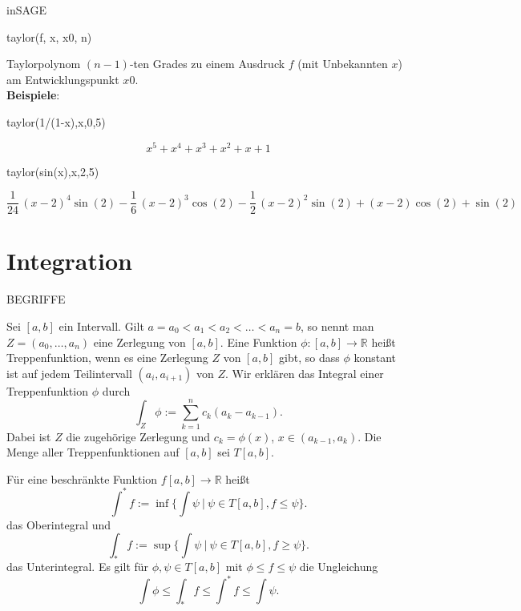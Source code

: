 \documentclass[fontsize=12pt,paper=a4,twoside,bibtotoc,idxtotoc,
liststotoc,pagesize,BCOR1.2cm,DIV15,chapterprefix,pagesize=pdftex]{scrbook}
\theoremstyle{plain}
\theoremstyle{definition}
\theoremstyle{remark}
\begin{document}
inSAGE

\begin{sagein}
taylor(f, x, x0, n)
\end{sagein}
Taylorpolynom $(n-1)$-ten Grades zu einem Ausdruck $f$ 
(mit Unbekannten $x$) am Entwicklungspunkt $x0$. \\
\textbf{Beispiele}:
\begin{sagein}
taylor(1/(1-x),x,0,5)
\end{sagein}
{\color{blue}\[ x^{5} + x^{4} + x^{3} + x^{2} + x + 1\]}
\begin{sagein}
taylor(sin(x),x,2,5)
\end{sagein}
{\small\color{blue}\[ \frac{1}{24} \, {\left(x - 2\right)}^{4} \sin\left(2\right) -
\frac{1}{6} \, {\left(x - 2\right)}^{3} \cos\left(2\right) - \frac{1}{2}
\, {\left(x - 2\right)}^{2} \sin\left(2\right) + {\left(x - 2\right)}
\cos\left(2\right) + \sin\left(2\right)\]}

\section{Integration}

BEGRIFFE


  Sei $[a,b]$ ein Intervall. Gilt $a=a_0 < a_1 <a_2 < \dots <
                                 a_n=b$, so nennt man $Z=(a_0, \dots
                                 ,a_n)$ eine {\color{red} Zerlegung} von
                                 $[a,b]$.
 Eine Funktion $\phi:[a,b] \rightarrow \mathbb{R}$ heißt {\color{red}
                                 Treppenfunktion}, wenn es eine
                                 Zerlegung $Z$ von $[a,b]$ gibt, so dass
                                 $\phi$ konstant ist auf jedem
                                 Teilintervall $(a_i,a_{i+1})$ von $Z$.
 Wir erklären das Integral einer Treppenfunktion $\phi$ durch
\[\int_Z \phi := \sum_{k=1}^n c_k (a_k -a_{k-1}).\]
Dabei ist $Z$ die zugehörige Zerlegung und $c_k=\phi(x)$, $x\in
(a_{k-1},a_k)$.  
 Die Menge aller Treppenfunktionen auf $[a,b]$ sei $T[a,b]$.


Für eine beschränkte Funktion $f[a,b]\rightarrow \mathbb{R}$
heißt
\[ \int^*f:= \inf  \{ \int \psi \ | \ \psi \in T[a,b], f \leq \psi \}. \]
das {\color{red} Oberintegral} und 
\[ \int_*f:= \sup  \{ \int \psi \ | \ \psi \in T[a,b], f \geq \psi \}.\]
das {\color{red} Unterintegral}. Es gilt für $\phi, \psi \in T[a,b]$ mit
$\phi \leq f \leq \psi$ die Ungleichung
\[ \int \phi \leq \int_* f \leq \int^* f \leq \int \psi.\]
\end{document}
